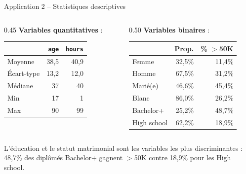 \documentclass[11pt,aspectratio=169]{beamer}
\begin{document}
\begin{frame}{Application 2 -- Statistiques descriptives}

\begin{columns}[T]
\begin{column}{0.45\textwidth}
\textbf{Variables quantitatives} :
\smallskip

    \small
    \renewcommand{\arraystretch}{1.2}
    \begin{tabular}{lrr}
        \toprule
        & \texttt{age} & \texttt{hours} \\
        \midrule
        Moyenne & 38,5 & 40,9 \\
        Écart-type & 13,2 & 12,0 \\
        Médiane & 37 & 40 \\
        Min & 17 & 1 \\
        Max & 90 & 99 \\
        \bottomrule
    \end{tabular}
\end{column}
\begin{column}{0.50\textwidth}
\textbf{Variables binaires} :
\smallskip

    \small
    \renewcommand{\arraystretch}{1.2}
    \begin{tabular}{lrr}
        \toprule
        & \textbf{Prop.} & \textbf{\% $>$50K} \\
        \midrule
        Femme & 32,5\% & 11,4\% \\
        Homme & 67,5\% & 31,2\% \\
        Marié(e) & 46,6\% & 45,4\% \\
        Blanc & 86,0\% & 26,2\% \\
        Bachelor+ & 25,2\% & 48,7\% \\
        High school & 62,2\% & 18,9\% \\
        \bottomrule
    \end{tabular}
\end{column}
\end{columns}

\bigskip

L'éducation et le statut matrimonial sont les variables les plus
discriminantes : 48,7\% des diplômés Bachelor+ gagnent $>$50K contre
18,9\% pour les High school.

\end{frame}
\end{document}
